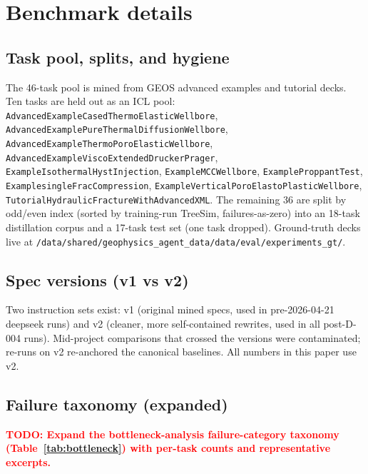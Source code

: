 \documentclass{article}
\newcommand{\todo}[1]{\textcolor{red}{\textbf{TODO: #1}}}
\begin{document}
\medskip

{
\small
}





\appendix

\section{Benchmark details}
\label{app:bench}

\subsection{Task pool, splits, and hygiene}
The 46-task pool is mined from GEOS advanced examples and tutorial decks. Ten tasks are held out as an ICL pool: \texttt{AdvancedExampleCasedThermoElasticWellbore}, \texttt{AdvancedExamplePureThermalDiffusionWellbore}, \texttt{AdvancedExampleThermoPoroElasticWellbore}, \texttt{AdvancedExampleViscoExtendedDruckerPrager}, \texttt{ExampleIsothermalHystInjection}, \texttt{ExampleMCCWellbore}, \texttt{ExampleProppantTest}, \texttt{ExamplesingleFracCompression}, \texttt{ExampleVerticalPoroElastoPlasticWellbore}, \texttt{TutorialHydraulicFractureWithAdvancedXML}. The remaining 36 are split by odd/even index (sorted by training-run TreeSim, failures-as-zero) into an 18-task distillation corpus and a 17-task test set (one task dropped). Ground-truth decks live at \texttt{/data/shared/geophysics\_agent\_data/data/eval/experiments\_gt/}.

\subsection{Spec versions (v1 vs v2)}
Two instruction sets exist: v1 (original mined specs, used in pre-2026-04-21 deepseek runs) and v2 (cleaner, more self-contained rewrites, used in all post-D-004 runs). Mid-project comparisons that crossed the versions were contaminated; re-runs on v2 re-anchored the canonical baselines. All numbers in this paper use v2.

\subsection{Failure taxonomy (expanded)}
\label{app:failures}

\todo{Expand the bottleneck-analysis failure-category taxonomy (Table~\ref{tab:bottleneck}) with per-task counts and representative excerpts.}
\end{document}
